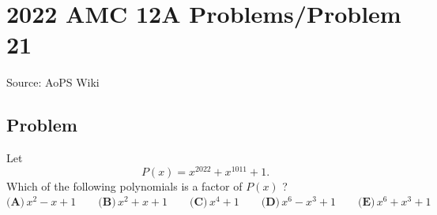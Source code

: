 \documentclass[12pt]{article}
\begin{document}
\section*{{2022 AMC 12A Problems/Problem 21}}
Source: AoPS Wiki

\subsection*{Problem}
Let \[P(x) = x^{2022} + x^{1011} + 1.\] Which of the following polynomials is a factor of $P(x)$ ? $\textbf{(A)} \, x^2 -x + 1 \qquad\textbf{(B)} \, x^2 + x + 1 \qquad\textbf{(C)} \, x^4 + 1 \qquad\textbf{(D)} \, x^6 - x^3 + 1 \qquad\textbf{(E)} \, x^6 + x^3 + 1$
\end{document}
